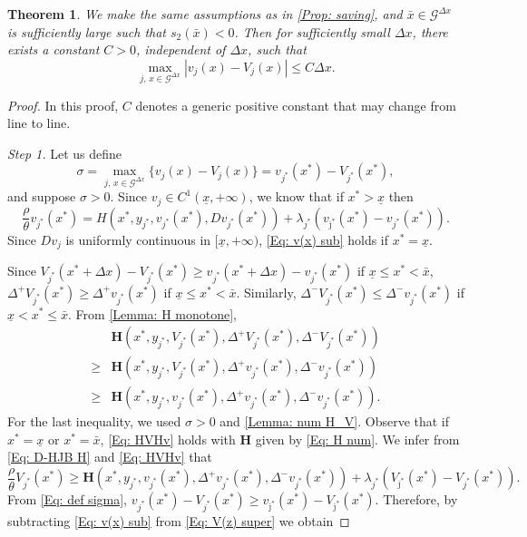 \documentclass[11pt]{article}
\numberwithin{equation}{section}
\numberwithin{algorithm}{section}
\newtheorem{theorem}{Theorem}[section]
\newcommand{\lc}{\left(}
\newcommand{\rc}{\right)}
\newcommand{\ux}{{\underline x}}
\newcommand{\beq}{\begin{equation}}
\newcommand{\eeq}{\end{equation}}
\theoremstyle{plain}
\newcommand{\D}{\Delta}
\begin{document}
\begin{theorem}\label{Thm: convergence rate}
We make the same assumptions as in \cref{Prop: saving}, and $\bar{x}\in \mathcal{G}^{\D x}$ is sufficiently large such that $s_2(\bar{x})<0$. Then for sufficiently small $\D x$, there exists a constant $C>0$, independent of $\D x$, such that
\beq\label{Eq: error}
\max_{j,\,x\in \mathcal{G}^{\D x}} \left\vert v_j(x)-V_{j}(x)\right\vert \leq C\D x.
\eeq
\end{theorem}
\begin{proof} In this proof, $C$ denotes a generic positive constant that may change from line to line. \par
{\it{Step 1.}}
Let us define 
\beq\label{Eq: def sigma}
\sigma=\max_{j,\, x\in \mathcal{G}^{\D x}} \{v_j(x)-V_{j}(x)\}=v_{j^*}(x^*)-V_{j^*}(x^*),
\eeq
and suppose $\sigma>0$. Since $v_j\in C^1(\ux,+\infty)$, we know that if $x^*>\ux$ then
\beq\label{Eq: v(x) sub}
\frac{\rho}{\theta} v_{j^*}(x^*)=
	H\lc x^*,y_{j^*},v_{j^*}(x^*),Dv_{j^*}(x^*)\rc+\lambda_{j^*}(v_{\bar \jmath^*}(x^*)-v_{j^*}(x^*)).
\eeq
Since $Dv_j$ is uniformly continuous in $[\ux,+\infty)$, \cref{Eq: v(x) sub} holds if $x^*=\ux$. \par 
Since 
$
V_{j^*}(x^*+\D x)-V_{j^*}(x^*)\geq v_{j^*}(x^*+\D x)-v_{j^*}(x^*)
$
if $\ux\leq x^*<\bar{x}$, $\D^+{V_{j^*}(x^*)}\geq \D^+{v_{j^*}(x^*)}$ if $\ux\leq x^*<\bar{x}$. 
Similarly, $\D^-{V_{j^*}(x^*)}\leq \D^-{v_{j^*}(x^*)}$ if $\ux< x^*\leq \bar{x}$. From \cref{Lemma: H monotone},
\beq\label{Eq: HVHv}
\begin{aligned}
&\boldsymbol{H}\lc x^*,y_{j^*},V_{j^*}(x^*),\D^+{V_{j^*}(x^*)},\D^-{V_{j^*}(x^*)}\rc\\
\geq {}&\boldsymbol{H}\lc x^*,y_{j^*},V_{j^*}(x^*),\D^+{v_{j^*}(x^*)},\D^-{v_{j^*}(x^*)}\rc\\
\geq {}&\boldsymbol{H}\lc x^*,y_{j^*},v_{j^*}(x^*),\D^+{v_{j^*}(x^*)},\D^-{v_{j^*}(x^*)}\rc.
\end{aligned}
\eeq
For the last inequality, we used $\sigma>0$ and \cref{Lemma: num H_V}. Observe that if $x^*=\ux$ or $x^*=\bar{x}$, \cref{Eq: HVHv} holds with $\boldsymbol{H}$ given by \cref{Eq: H num}. We infer from \cref{Eq: D-HJB H} and \cref{Eq: HVHv} that
\beq\label{Eq: V(z) super}
\frac{\rho}{\theta}V_{j^*}(x^*)\geq \boldsymbol{H}\lc x^*,y_{j^*},v_{j^*}(x^*),\D^+{v_{j^*}(x^*)},\D^-{v_{j^*}(x^*)}\rc+\lambda_{j^*}(V_{\bar \jmath^*}(x^*)-V_{j^*}(x^*)).
\eeq
From \cref{Eq: def sigma}, $v_{j^*}(x^*)-V_{j^*}(x^*)\geq v_{\bar \jmath^*}(x^*)-V_{\bar \jmath^*}(x^*)$. Therefore,  by subtracting  \cref{Eq: v(x) sub} from \cref{Eq: V(z) super} we obtain 

\end{proof}
\end{document}
